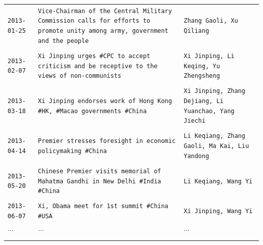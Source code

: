 \documentclass[11pt,english]{article}
\begin{document}
\begin{flushleft}
\begin{center}
\begin{table}[H]
\begin{tabular}{p{1in}p{3in}p{2in}}
  \tt{2013-01-25}  & \tt{Vice-Chairman of the Central Military Commission calls for efforts to promote unity among army, government and the people} & \tt{Zhang Gaoli, Xu Qiliang}\\
    &  &  \\
  \tt{2013-02-07}  & \tt{Xi Jinping urges \#CPC to accept criticism and be receptive to the views of non-communists} & \tt{Xi Jinping, Li Keqing, Yu Zhengsheng}\\
    &  &  \\
   \tt{2013-03-18}  & \tt{Xi Jinping endorses work of Hong Kong \#HK, \#Macao governments \#China} & \tt{Xi Jinping, Zhang Dejiang, Li Yuanchao, Yang Jiechi}\\
    &  &  \\
   \tt{2013-04-14}  & \tt{Premier stresses foresight in economic policymaking \#China} & \tt{Li Keqiang, Zhang Gaoli, Ma Kai, Liu Yandong}\\
    &  &  \\
   \tt{2013-05-20}  & \tt{Chinese Premier visits memorial of Mahatma Gandhi in New Delhi \#India \#China} & \tt{Li Keqiang, Wang Yi}\\
    &  &  \\
   \tt{2013-06-07}  & \tt{Xi, Obama meet for 1st summit \#China \#USA} & \tt{Xi Jinping, Wang Yi}\\
   ... & ...  & ... \\ \\[-1.8ex]     \hline
 \hline \\[-1.8ex]
\end{tabular}
\end{table}
\par\end{center}


\end{flushleft}
\end{document}
